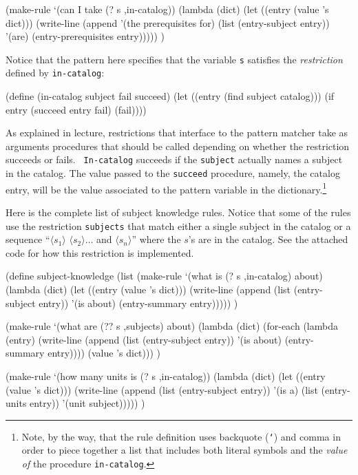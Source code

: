 \beginlisp
(make-rule
 `(can I take (? s ,in-catalog))
 (lambda (dict)
   (let ((entry (value 's dict)))
     (write-line
      (append '(the prerequisites for)
              (list (entry-subject entry))
              '(are)
              (entry-prerequisites entry))))) )
\endlisp

Notice that the pattern here specifies that the variable {\tt s} satisfies
the {\em restriction} defined by {\tt in-catalog}:

\beginlisp
(define (in-catalog subject fail succeed)
  (let ((entry (find subject catalog)))
    (if entry
        (succeed entry fail)
        (fail))))
\endlisp

As explained in lecture, restrictions that interface to the pattern
matcher take as arguments procedures that should be called
depending on whether the restriction succeeds or fails.  {\tt
In-catalog} succeeds if the {\tt subject} actually names a subject in
the catalog.  The value passed to the {\tt succeed} procedure, namely,
the catalog entry, will be the value associated to the pattern
variable in the dictionary.\footnote{Note, by the way, that the rule
definition uses backquote ({\tt `}) and comma in order to piece
together a list that includes both literal symbols and the {\em value
of} the procedure {\tt in-catalog}.}

Here is the complete list of subject knowledge rules.  Notice that
some of the rules use the restriction {\tt subjects} that match either
a single subject in the catalog or a sequence ``$\langle s_1\rangle $
$\langle s_2\rangle \ldots $ and $\langle s_n\rangle $'' where the
$s$'s are in the catalog.  See the attached code for how this
restriction is implemented.

\beginlisp
(define subject-knowledge
  (list
   (make-rule
    `(what is (? s ,in-catalog) about)
    (lambda (dict)
      (let ((entry (value 's dict)))
        (write-line
         (append (list (entry-subject entry))
                 '(is about)
                 (entry-summary entry))))) )

   (make-rule
    `(what are (?? s ,subjects) about)
    (lambda (dict)
      (for-each (lambda (entry)
                  (write-line
                   (append (list (entry-subject entry))
                           '(is about)
                           (entry-summary entry))))
                (value 's dict))) )

   (make-rule
    `(how many units is (? s ,in-catalog))
    (lambda (dict)
      (let ((entry (value 's dict)))
        (write-line
         (append (list (entry-subject entry))
                 '(is a)
                 (list (entry-units entry))
                 '(unit subject))))) )

